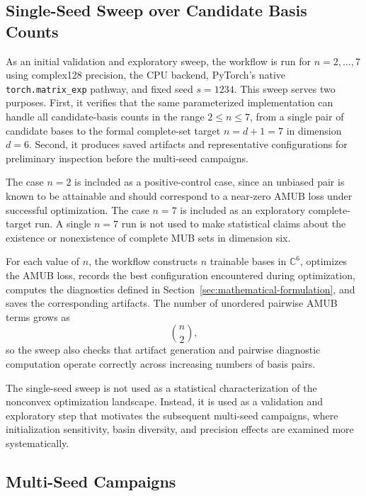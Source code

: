 \documentclass[a4paper,twocolumn,11pt,amsfonts,amssymb]{quantumarticle}
\begin{document}
\subsection{Single-Seed Sweep over Candidate Basis Counts}

As an initial validation and exploratory sweep, the workflow is run for \(n=2,\ldots,7\) using complex128 precision, the CPU backend, PyTorch's native \texttt{torch.matrix\_exp} pathway, and fixed seed \(s=1234\). This sweep serves two purposes. First, it verifies that the same parameterized implementation can handle all candidate-basis counts in the range \(2 \leq n \leq 7\), from a single pair of candidate bases to the formal complete-set target \(n=d+1=7\) in dimension \(d=6\). Second, it produces saved artifacts and representative configurations for preliminary inspection before the multi-seed campaigns.

The case \(n=2\) is included as a positive-control case, since an unbiased pair is known to be attainable and should correspond to a near-zero AMUB loss under successful optimization. The case \(n=7\) is included as an exploratory complete-target run. A single \(n=7\) run is not used to make statistical claims about the existence or nonexistence of complete MUB sets in dimension six.

For each value of \(n\), the workflow constructs \(n\) trainable bases in \(\mathbb{C}^6\), optimizes the AMUB loss, records the best configuration encountered during optimization, computes the diagnostics defined in Section~\ref{sec:mathematical-formulation}, and saves the corresponding artifacts. The number of unordered pairwise AMUB terms grows as
\begin{equation*}
    \binom{n}{2},
\end{equation*}
so the sweep also checks that artifact generation and pairwise diagnostic computation operate correctly across increasing numbers of basis pairs.

The single-seed sweep is not used as a statistical characterization of the nonconvex optimization landscape. Instead, it is used as a validation and exploratory step that motivates the subsequent multi-seed campaigns, where initialization sensitivity, basin diversity, and precision effects are examined more systematically.

\subsection{Multi-Seed Campaigns}
\end{document}
